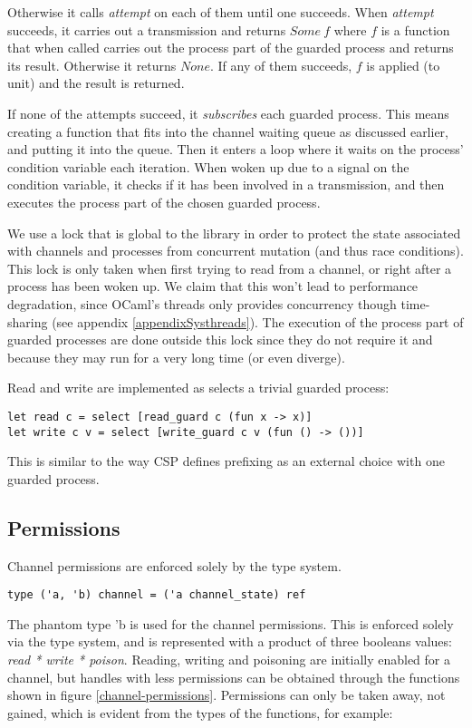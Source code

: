 \documentclass[a4paper,12pt]{article}
\begin{document}
Otherwise it calls \emph{attempt} on each of them until one succeeds.
When \emph{attempt} succeeds, it carries out a transmission and returns $Some\
f$ where $f$ is a function that when called carries out the process part of the
guarded process and returns its result. Otherwise it returns $None$. If any of
them succeeds, $f$ is applied (to unit) and the result is returned.

If none of the attempts succeed, it \emph{subscribes} each guarded process.
This means creating a function that fits into the channel waiting queue
as discussed earlier, and putting it into the queue. Then it enters a loop
where it waits on the process' condition variable each iteration. When woken up
due to a signal on the condition variable, it checks if it has been involved in
a transmission, and then executes the process part of the chosen guarded
process.

We use a lock that is global to the library in order to protect the state
associated with channels and processes from concurrent mutation (and
thus race conditions). This lock is only taken when first trying to read from a
channel, or right after a process has been woken up. We claim that this won't
lead to performance degradation, since OCaml's threads only provides concurrency
though time-sharing (see appendix \ref{appendixSysthreads}). The execution of
the process part of guarded processes are done outside this lock since they do
not require it and because they may run for a very long time (or even diverge).

Read and write are implemented as selects a trivial guarded process:
\begin{verbatim}
let read c = select [read_guard c (fun x -> x)]
let write c v = select [write_guard c v (fun () -> ())]
\end{verbatim}
This is similar to the way CSP defines prefixing as an external choice with one
guarded process.

\subsection{Permissions}

Channel permissions are enforced solely by the type system.

\begin{verbatim}
type ('a, 'b) channel = ('a channel_state) ref
\end{verbatim}

The phantom type 'b is used for the channel permissions. This is enforced solely via the type
system, and is represented with a product of three booleans values: \emph{read * write * poison}.
Reading, writing and poisoning are initially enabled for a channel, but handles with less 
permissions can be obtained through the functions shown in figure \ref{channel-permissions}. 
Permissions can only be taken away, not gained, which is evident from the types of the 
functions, for example: 
\end{document}
